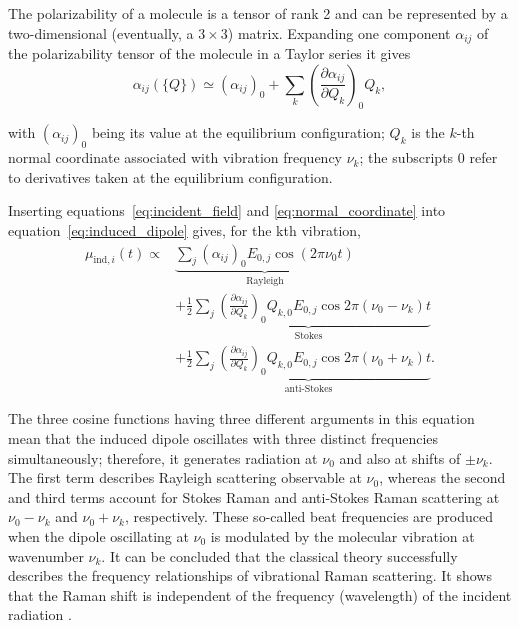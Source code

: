 The polarizability of a molecule is a tensor of rank 2 and can be represented by a
two-dimensional (eventually, a \(3 \times 3\)) matrix. 
Expanding one component \(\alpha_{ij}\) of the polarizability tensor of the molecule in a Taylor series it gives
\begin{equation}
    \alpha_{ij}(\{Q\}) \simeq
    \left(\alpha_{ij}\right)_0 +
    \sum_k
    \left(\frac{\partial \alpha_{ij}}{\partial Q_k}\right)_0 Q_k  
    \label{eq:polarizability_taylor},
\end{equation}

 with
\((\alpha_{ij})_0\) being its value at the equilibrium configuration;
\(Q_k\) is the \(k\)-th normal coordinate associated with vibration frequency
\(\nu_k\); the subscripts \(0\) refer to derivatives taken at the equilibrium configuration.

Inserting equations~\eqref{eq:incident_field} and \eqref{eq:normal_coordinate} into equation~\eqref{eq:induced_dipole} gives, for
the kth vibration,
\begin{equation}
\begin{aligned}
    \mu_{\mathrm{ind},i}(t) \propto {}&
    \underbrace{\sum_j \left(\alpha_{ij}\right)_0 E_{0,j} \cos(2\pi \nu_0 t)}_{\text{Rayleigh}} \\
    &+
    \underbrace{\frac{1}{2}\sum_j
    \left(\frac{\partial \alpha_{ij}}{\partial Q_k}\right)_0
    Q_{k,0}E_{0,j}
    \cos 2\pi(\nu_0-\nu_k)t}_{\text{Stokes}} \\
    &+
    \underbrace{\frac{1}{2}\sum_j
    \left(\frac{\partial \alpha_{ij}}{\partial Q_k}\right)_0
    Q_{k,0}E_{0,j}
    \cos 2\pi(\nu_0+\nu_k)t}_{\text{anti-Stokes}} .
\end{aligned}
\label{eq:induced_dipole_components}
\end{equation}

The three cosine functions having three different arguments in this equation mean that the induced dipole oscillates with three distinct frequencies simultaneously; therefore, it generates radiation at \(\nu_0\) and also at shifts of \(\pm \nu_k\). The first term describes Rayleigh scattering observable at \(\nu_0\), whereas the second and third terms account for Stokes Raman and anti-Stokes Raman scattering at \(\nu_0 - \nu_k\) and \(\nu_0 + \nu_k\), respectively. These so-called beat frequencies are produced when the dipole oscillating at \(\nu_0\) is modulated by the molecular vibration at wavenumber \(\nu_k\). 
It can be concluded that the classical theory successfully describes the frequency relationships of vibrational Raman scattering. It shows that the Raman shift is independent of
the frequency (wavelength) of the incident radiation \cite{keresztury2002raman}. 


